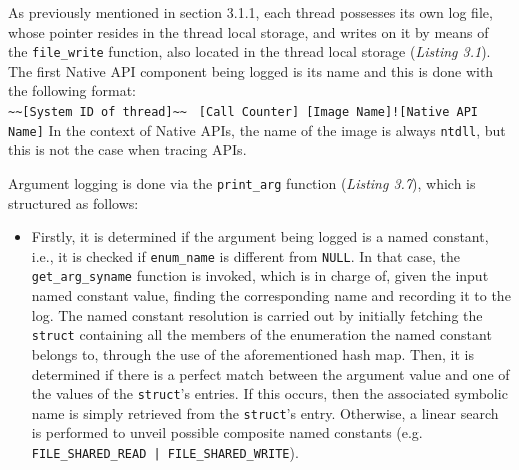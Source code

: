 As previously mentioned in section 3.1.1, each thread possesses its own log file, whose pointer resides in the thread local storage, and writes on it by means of the \texttt{file\_write} function, also located in the thread local storage (\textit{Listing 3.1}). The first Native API component being logged is its name and this is done with the following format:
\\ 
\texttt{\textasciitilde\textasciitilde[System ID of thread]\textasciitilde\textasciitilde} \texttt{ [Call Counter] [Image Name]![Native API Name]}  
In the context of Native APIs, the name of the image is always \texttt{ntdll}, but this is not the case when tracing APIs.

Argument logging is done via the \texttt{print\_arg} function (\textit{Listing 3.7}), which is structured as follows:

\begin{itemize}
\item Firstly, it is determined if the argument being logged is a named constant, i.e., it is checked if \texttt{enum\_name} is different from \texttt{NULL}. In that case, the \texttt{get\_arg\_syname} function is invoked, which is in charge of, given the input named constant value, finding the corresponding name and recording it to the log. The named constant resolution is carried out by initially fetching the \texttt{struct} containing all the members of the enumeration the named constant belongs to, through the use of the aforementioned hash map. Then, it is determined if there is a perfect match between the argument value and one of the values of the \texttt{struct}'s entries. If this occurs, then the associated symbolic name is simply retrieved from the \texttt{struct}'s entry. Otherwise, a linear search is performed to unveil possible composite named constants (e.g. \texttt{FILE\_SHARED\_READ | FILE\_SHARED\_WRITE}).    

\end{itemize}


